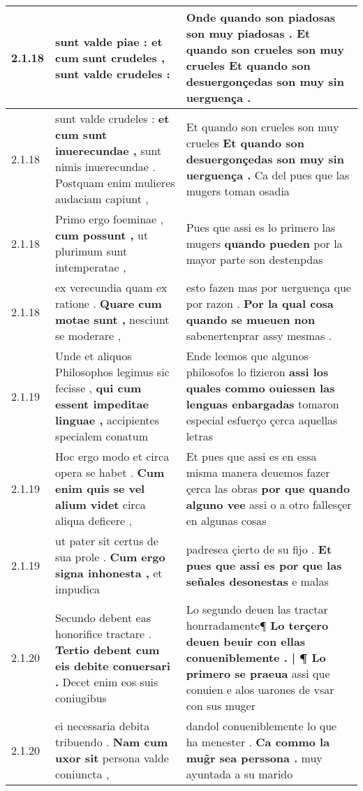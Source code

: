 \begin{tabular}{|p{1cm}|p{6.5cm}|p{6.5cm}|}
2.1.18 & sunt valde piae : \textbf{ et cum sunt crudeles , } sunt valde crudeles : & Onde quando son piadosas son muy piadosas . \textbf{ Et quando son crueles son muy crueles } Et quando son desuergonçedas son muy sin uerguença . \\\hline
2.1.18 & sunt valde crudeles : \textbf{ et cum sunt inuerecundae , } sunt nimis inuerecundae . Postquam enim mulieres audaciam capiunt , & Et quando son crueles son muy crueles \textbf{ Et quando son desuergonçedas son muy sin uerguença . } Ca del pues que las mugers toman osadia \\\hline
2.1.18 & Primo ergo foeminae , \textbf{ cum possunt , } ut plurimum sunt intemperatae , & Pues que assi es lo primero las mugers \textbf{ quando pueden } por la mayor parte son destenpdas \\\hline
2.1.18 & ex verecundia quam ex ratione . \textbf{ Quare cum motae sunt , } nesciunt se moderare , & esto fazen mas por uerguença que por razon . \textbf{ Por la qual cosa quando se mueuen non } sabenertenprar assy mesmas . \\\hline
2.1.19 & Unde et aliquos Philosophos legimus sic fecisse , \textbf{ qui cum essent impeditae linguae , } accipientes specialem conatum & Ende leemos que algunos philosofos lo fizieron \textbf{ assi los quales commo ouiessen las lenguas enbargadas } tomaron especial esfuerço çerca aquellas letras \\\hline
2.1.19 & Hoc ergo modo et circa opera se habet . \textbf{ Cum enim quis se vel alium videt } circa aliqua deficere , & Et pues que assi es en essa misma manera deuemos fazer çerca las obras \textbf{ por que quando alguno vee } assi o a otro fallesçer en algunas cosas \\\hline
2.1.19 & ut pater sit certus de sua prole . \textbf{ Cum ergo signa inhonesta , } et impudica & padresea çierto de su fijo . \textbf{ Et pues que assi es por que las señales desonestas } e malas \\\hline
2.1.20 & Secundo debent eas honorifice tractare . \textbf{ Tertio debent cum eis debite conuersari . } Decet enim eos suis coniugibus & Lo segundo deuen las tractar honrradamente¶ \textbf{ Lo terçero deuen beuir con ellas conueniblemente . | ¶ Lo primero se praeua } assi que conuien e alos uarones de vsar con sus muger \\\hline
2.1.20 & ei necessaria debita tribuendo . \textbf{ Nam cum uxor sit } persona valde coniuncta , & dandol conueniblemente lo que ha menester . \textbf{ Ca commo la mug̃r sea perssona . } muy ayuntada a su marido \\\hline

\end{tabular}
